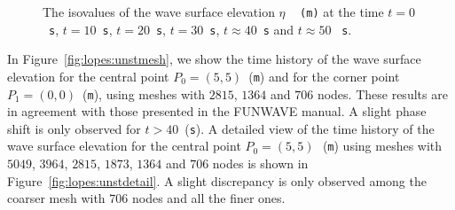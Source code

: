 \begin{figure}
{    \caption{The isovalues of the wave surface elevation $\eta$\,~{\tt
        (m)} at the time $t=0$~{\tt s}, $t=10$~{\tt s}, $t=20$~{\tt s},
      $t=30$~{\tt s}, $t\approx40$~{\tt s} and $t\approx50$ ~{\tt s}. }\par}
  \label{fig:lopes:symmetry}
\end{figure}

In Figure~\ref{fig:lopes:unstmesh}, we show the time history of the
wave surface elevation for the central point $P_0=(5,5)$~({\tt m}) and
for the corner point $P_1=(0,0)$~({\tt m}), using meshes with $2815$,
$1364$ and $706$ nodes.  These results are in agreement with those
presented in the FUNWAVE manual. A slight phase shift is only observed
for $t>40$~({\tt s}).  A detailed view of the time history of the wave
surface elevation for the central point $P_0=(5,5)$\,~({\tt m}) using
meshes with $5049$, $3964$, $2815$, $1873$, $1364$ and $706$ nodes is
shown in Figure~\ref{fig:lopes:unstdetail}. A slight discrepancy is
only observed among the coarser mesh with $706$ nodes and all the
finer ones.

